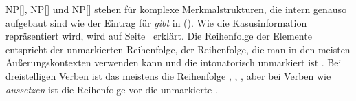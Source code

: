 NP[], NP[] und NP[] stehen für komplexe Merkmalstrukturen, die intern
genauso aufgebaut sind wie der Eintrag für \emph{gibt} in (). Wie die Kasusinformation
repräsentiert wird, wird auf Seite~\pageref{page-ref-case-feat} erklärt. Die Reihenfolge der
Elemente entspricht der unmarkierten Reihenfolge, \dash der Reihenfolge, die man in den meisten
Äußerungskontexten verwenden kann und die intonatorisch unmarkiert ist \citep{Hoehle82a}. Bei dreistelligen Verben ist
das meistens die Reihenfolge , , , aber bei Verben wie
\emph{aussetzen} ist die Reihenfolge  vor  die unmarkierte \parencites[]{Wegener85b}[S.\,60]{Hoberg81a}. 
%


